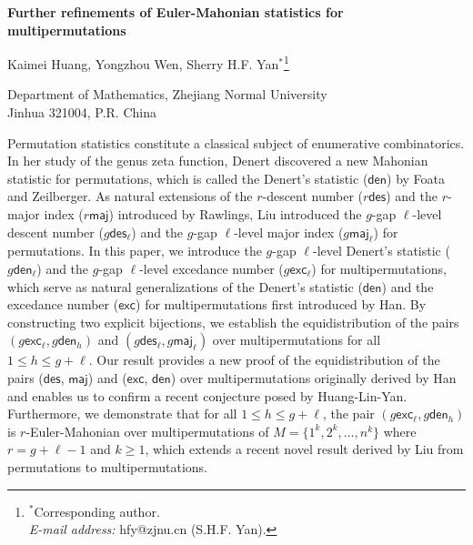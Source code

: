 \documentclass[12pt]{article}
\numberwithin{equation}{section}
\theoremstyle{plain}
\def\des{\mathsf{des}}
\def\maj{\mathsf{maj}}
\def\exc{\mathsf{exc}}
\def\den{\mathsf{den}}
\begin{document}
	\begin{center}
		{\Large\bf Further refinements of  Euler-Mahonian statistics for multipermutations}
	\end{center}
	
	\begin{center}
		
		{\small Kaimei Huang,  Yongzhou Wen,
			Sherry H.F. Yan$^{*}$\footnote{$^*$Corresponding author. \\{\em E-mail address:}   hfy@zjnu.cn (S.H.F. Yan). }} 
		
		 Department of Mathematics,
		Zhejiang Normal University\\
		Jinhua 321004, P.R. China
		
	 
		
		
		
	\end{center}
	
	
	
	
	
	
	
	Permutation statistics constitute a classical subject of enumerative combinatorics.  In her study of the genus zeta function,  Denert  discovered a new Mahonian statistic for permutations, which is called the Denert's statistic  ({\bf $\den$}) by Foata and Zeilberger. As natural extensions of the $r$-descent number ({\bf $r\des$}) and the $r$-major index ({\bf $r\maj$}) introduced by Rawlings,  Liu introduced    the $g$-gap $\ell$-level descent number  ({\bf $g\des_{\ell}$})  and the $g$-gap $\ell$-level  major index   ({\bf $g\maj_{\ell}$}) for permutations. 
	In this paper, we introduce  the $g$-gap $\ell$-level Denert's statistic ({\bf $g\den_{\ell}$})  and the $g$-gap $\ell$-level excedance number ({\bf $g\exc_{\ell}$}) for multipermutations, which serve as natural generalizations of the Denert's statistic ({\bf $\den$}) and the excedance number ({\bf $\exc$}) for multipermutations first introduced by Han.   By constructing   two  explicit bijections, we      establish the equidistribution of   the pairs $(g\exc_{\ell}, g\den_{h} )$ and $(g\des_{\ell}, g\maj_{\ell})$  over  multipermutations for all   $1\leq h\leq g+\ell$. Our result  provides a new proof of the equidistribution of the pairs    ($\des$, $\maj$) and ($\exc$, $\den$) over multipermutations originally  derived by Han and  enables us to confirm a recent conjecture posed by Huang-Lin-Yan.   Furthermore, we  demonstrate  that for
	all  $1\leq h\leq g+\ell$,  the pair  $(g\exc_\ell, g\den_{h})$ is $r$-Euler-Mahonian over   multipermutations of $M=\{1^k, 2^k, \ldots, n^k\}$ where $r=g+\ell-1$ and $k\geq 1$, which extends a recent novel result derived by Liu from permutations to multipermutations. 
	
\end{document}
